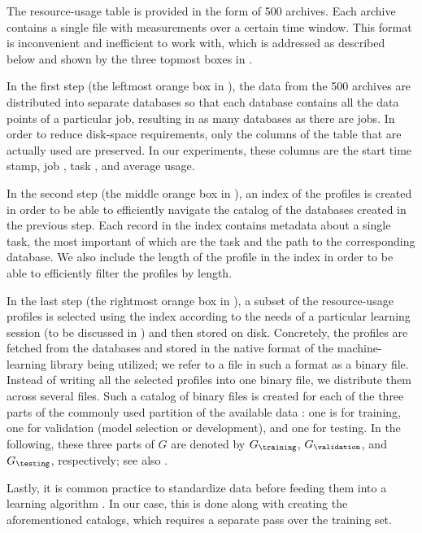 The resource-usage table is provided in the form of 500 archives. Each archive
contains a single file with measurements over a certain time window. This format
is inconvenient and inefficient to work with, which is addressed as described
below and shown by the three topmost boxes in .

In the first step (the leftmost orange box in ), the data
from the 500 archives are distributed into separate databases so that each
database contains all the data points of a particular job, resulting in as many
databases as there are jobs. In order to reduce disk-space requirements, only
the columns of the table that are actually used are preserved. In our
experiments, these columns are the start time stamp, job , task ,
and average  usage.

In the second step (the middle orange box in ), an index of
the profiles is created in order to be able to efficiently navigate the catalog
of the databases created in the previous step. Each record in the index contains
metadata about a single task, the most important of which are the task 
and the path to the corresponding database. We also include the length of the
profile in the index in order to be able to efficiently filter the profiles by
length.

In the last step (the rightmost orange box in ), a subset
of the resource-usage profiles is selected using the index according to the
needs of a particular learning session (to be discussed in )
and then stored on disk. Concretely, the profiles are fetched from the databases
and stored in the native format of the machine-learning library being utilized;
we refer to a file in such a format as a binary file. Instead of writing all the
selected profiles into one binary file, we distribute them across several files.
Such a catalog of binary files is created for each of the three parts of the
commonly used partition of the available data \cite{hastie2013}: one is for
training, one for validation (model selection or development), and one for
testing. In the following, these three parts of $G$ are denoted by
$G_\training$, $G_\validation$, and $G_\testing$, respectively; see also
.

Lastly, it is common practice to standardize data before feeding them into a
learning algorithm \cite{hastie2013}. In our case, this is done along with
creating the aforementioned catalogs, which requires a separate pass over the
training set.


